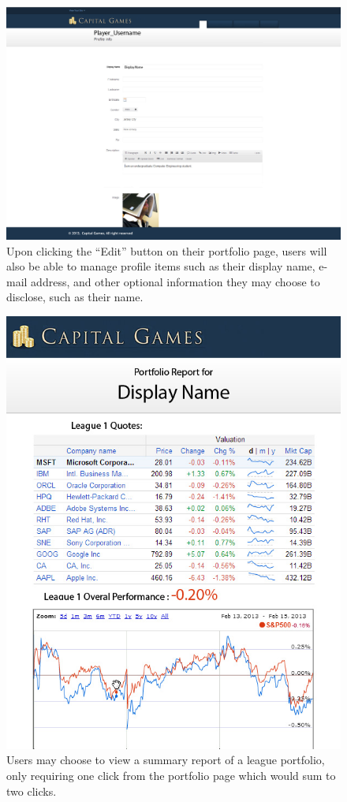 {
\begin{figure}
\centering
\includegraphics[width=5.5in]{./mockups/JPEG/ProfileManagement.jpg}
\caption{Upon clicking the ``Edit'' button on their portfolio page, users will also be able to manage profile items such as their display name, e-mail address, and other optional information they may choose to disclose, such as their name.}
\end{figure}
}


{
\begin{figure}
\centering
\includegraphics[width=5.5in]{./mockups/JPEG/Report.jpg}
\caption{Users may choose to view a summary report of a league portfolio, only requiring one click from the portfolio page which would sum to two clicks.}
\end{figure}
}

